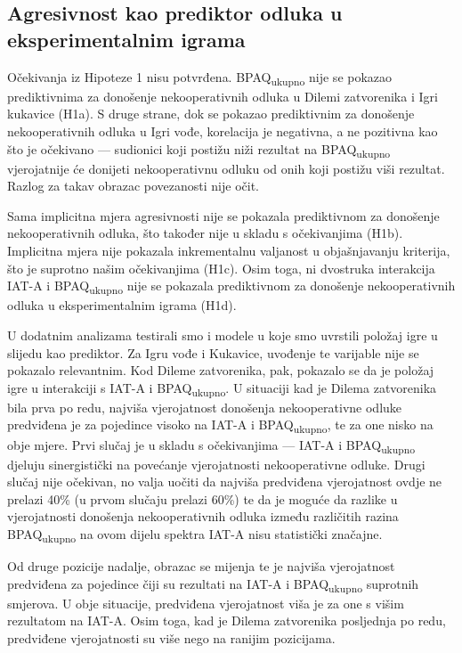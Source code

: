 \documentclass[a4paper, 12pt]{report}
\begin{document}
\subsection{Agresivnost kao prediktor odluka u eksperimentalnim igrama}

Očekivanja iz Hipoteze 1 nisu potvrđena. BPAQ\textsubscript{ukupno} 
nije se pokazao prediktivnima za donošenje nekooperativnih odluka u Dilemi
zatvorenika i Igri kukavice (H1a). S druge strane, dok se pokazao
prediktivnim za donošenje nekooperativnih odluka u Igri vođe, korelacija je
negativna, a ne pozitivna kao što je očekivano --- sudionici koji postižu niži
rezultat na BPAQ\textsubscript{ukupno} vjerojatnije će donijeti
nekooperativnu odluku od onih koji postižu viši rezultat.
Razlog za takav obrazac povezanosti nije očit. 

Sama implicitna mjera agresivnosti nije se pokazala prediktivnom za donošenje
nekooperativnih odluka, što također nije u skladu s očekivanjima (H1b).
Implicitna mjera nije pokazala inkrementalnu valjanost u objašnjavanju
kriterija, što je suprotno našim očekivanjima (H1c).
Osim toga, ni dvostruka interakcija IAT-A i BPAQ\textsubscript{ukupno} 
nije se pokazala prediktivnom za donošenje nekooperativnih odluka u
eksperimentalnim igrama (H1d).

U dodatnim analizama testirali smo i modele u 
koje smo uvrstili položaj igre u slijedu kao prediktor.
Za Igru vođe i Kukavice, uvođenje te varijable nije se pokazalo relevantnim. 
Kod Dileme zatvorenika, pak, pokazalo se da je položaj igre u
interakciji s IAT-A i BPAQ\textsubscript{ukupno}. U situaciji kad je
Dilema zatvorenika bila prva po redu, najviša vjerojatnost donošenja
nekooperativne odluke predviđena je za pojedince visoko na IAT-A i
BPAQ\textsubscript{ukupno}, te za one nisko na obje mjere. Prvi slučaj
je u skladu s očekivanjima --- IAT-A i BPAQ\textsubscript{ukupno}
djeluju sinergistički na povećanje vjerojatnosti nekooperativne odluke. Drugi
slučaj nije očekivan, no valja uočiti da najviša predviđena vjerojatnost ovdje ne
prelazi 40\% (u prvom slučaju prelazi 60\%) te da je moguće da razlike u
vjerojatnosti donošenja nekooperativnih odluka između
različitih razina BPAQ\textsubscript{ukupno} na ovom dijelu spektra
IAT-A nisu statistički značajne.

Od druge pozicije nadalje, obrazac se  mijenja te je najviša vjerojatnost
predviđena za pojedince čiji su rezultati na IAT-A i BPAQ\textsubscript{ukupno}
suprotnih smjerova. U obje situacije, predviđena vjerojatnost viša je
za one s višim rezultatom na IAT-A. Osim toga, kad je Dilema zatvorenika
posljednja po redu, predviđene vjerojatnosti su više nego na ranijim pozicijama.
\end{document}
